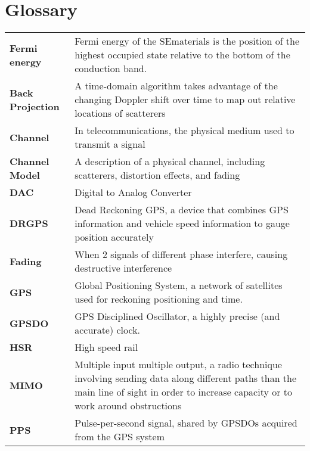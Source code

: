 
\chapter*{Glossary}

\renewcommand{\arraystretch}{1.5}
\begin{longtable}{>{\raggedleft\arraybackslash}p{3.5cm}p{11cm}}
\bfseries{Fermi energy} & Fermi energy of the SEmaterials is the position of the highest occupied state relative to the bottom of the conduction band. \\
\bfseries{Back Projection} & A time-domain algorithm takes advantage of the changing Doppler shift over time to map out relative locations of scatterers\\
\bfseries{Channel} & In telecommunications, the physical medium used to transmit a signal\\
\bfseries{Channel Model} & A description of a physical channel, including scatterers, distortion effects, and fading\\
\bfseries{DAC} & Digital to Analog Converter\\
\bfseries{DRGPS} & Dead Reckoning GPS, a device that combines GPS information and vehicle speed information to gauge position accurately\\
\bfseries{Fading} & When 2 signals of different phase interfere, causing destructive interference\\
\bfseries{GPS} & Global Positioning System, a network of satellites used for reckoning positioning and time. \\
\bfseries{GPSDO} & GPS Disciplined Oscillator, a highly precise (and accurate) clock. \\
\bfseries{HSR} & High speed rail \\
\bfseries{MIMO} & Multiple input multiple output, a radio technique involving sending data along different paths than the main line of sight in order to increase capacity or to work around obstructions\\
\bfseries{PPS} & Pulse-per-second signal, shared by GPSDOs acquired from the GPS system\\

\end{longtable}
